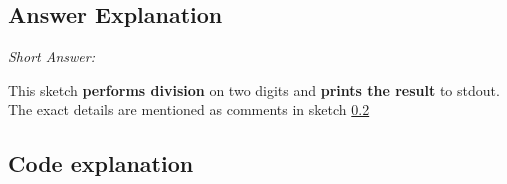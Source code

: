 \documentclass[]{article}
\begin{document}
\subsection{Answer Explanation}
\emph{Short Answer:}

This sketch \textbf{performs division} on two digits and \textbf{prints the result} to stdout. The exact details are mentioned as comments in sketch \ref{sketch 4}

\subsection{Code explanation} \label{sketch 4}
\lstset{
	showstringspaces=false
}


\end{document}
